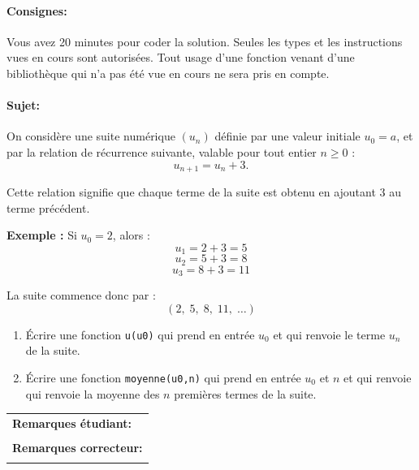 \documentclass[a4paper,11pt]{article}
\begin{document}
\paragraph*{Consignes:} Vous avez 20 minutes pour coder la solution. Seules les types et les instructions vues en cours sont autorisées. Tout usage d'une fonction 
venant d'une bibliothèque qui n'a pas été vue en cours ne sera pris en compte. 

\vspace{-0.2 cm}
\vspace{-0.2 cm}
\paragraph*{Sujet:}

On considère une suite numérique $(u_n)$ définie par une valeur initiale $u_0 = a$, et par la relation de récurrence suivante, valable pour tout entier $n \ge 0$ :
\[
u_{n+1} = u_n + 3.
\]

Cette relation signifie que chaque terme de la suite est obtenu en ajoutant 3 au terme précédent.

\vspace{0.5 cm}

\textbf{Exemple :}  
Si $u_0 = 2$, alors :
\[
u_1 = 2 + 3 = 5
\]
\[
u_2 = 5 + 3 = 8
\]
\[
u_3 = 8 + 3 = 11
\]

La suite commence donc par :
\[
(2,\; 5,\; 8,\; 11,\; \ldots)
\]



\begin{enumerate}
\item[1.] Écrire une fonction \texttt{u(u0)} qui prend en entrée $u_0$ et qui renvoie  le terme $u_n$ de la suite.
\item[2.] Écrire une fonction \texttt{moyenne(u0,n)} qui prend en entrée $u_0$ et $n$ et qui renvoie   qui renvoie la moyenne des $n$ premières termes de la suite. 
\end{enumerate}


\vspace{1 cm}
\begin{table}[h!]
\centering
\renewcommand{\arraystretch}{1.4} %
\begin{tabular}{|p{15cm}|}
\hline
\textbf{Remarques étudiant:}    \\
 \\
\hline
\textbf{Remarques correcteur:}  \\
 \\
\hline
\end{tabular}
\end{table}
\end{document}
